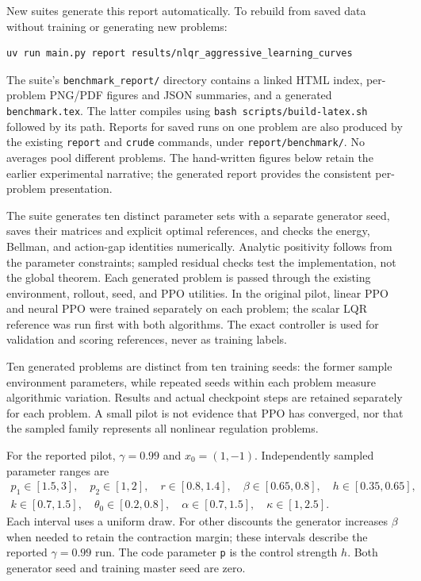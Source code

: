 \documentclass[11pt]{article}
\begin{document}
New suites generate this report automatically. To rebuild from saved data without
training or generating new problems:
\begin{verbatim}
uv run main.py report results/nlqr_aggressive_learning_curves
\end{verbatim}
The suite's \texttt{benchmark\_report/} directory contains a linked HTML index,
per-problem PNG/PDF figures and JSON summaries, and a generated
\texttt{benchmark.tex}. The latter compiles using
\texttt{bash scripts/build-latex.sh} followed by its path. Reports for saved runs
on one problem are also produced by the existing \texttt{report} and
\texttt{crude} commands, under \texttt{report/benchmark/}. No averages pool
different problems. The hand-written figures below retain the earlier experimental
narrative; the generated report provides the consistent per-problem presentation.
\label{sec:energy-protocol}

The suite generates ten distinct parameter sets with a separate generator seed, saves
their matrices and explicit optimal references, and checks the energy, Bellman, and
action-gap identities numerically. Analytic positivity follows from the parameter
constraints; sampled residual checks test the implementation, not the global theorem.
Each generated problem is passed through the existing environment, rollout, seed,
and PPO utilities. In the original pilot, linear PPO and neural PPO were trained
separately on each problem; the scalar LQR reference was run first with both
algorithms. The exact controller is
used for validation and scoring references, never as training labels.

Ten generated problems are distinct from ten training seeds: the former sample
environment parameters, while repeated seeds within each problem measure algorithmic
variation. Results and actual checkpoint steps are retained separately for each
problem. A small pilot is not evidence that PPO has converged, nor that the sampled
family represents all nonlinear regulation problems.

For the reported pilot, $\gamma=0.99$ and $x_0=(1,-1)$. Independently sampled
parameter ranges are
\[
\begin{gathered}
 p_1\in[1.5,3],\quad p_2\in[1,2],\quad r\in[0.8,1.4],\quad
 \beta\in[0.65,0.8],\quad h\in[0.35,0.65],\\
 k\in[0.7,1.5],\quad \theta_0\in[0.2,0.8],\quad
 \alpha\in[0.7,1.5],\quad \kappa\in[1,2.5].
\end{gathered}
\]
Each interval uses a uniform draw. For other discounts the generator increases
$\beta$ when needed to retain the contraction margin; these intervals describe the
reported $\gamma=0.99$ run. The code parameter \texttt{p} is the control strength $h$.
Both generator seed and training master seed are zero.
\end{document}
